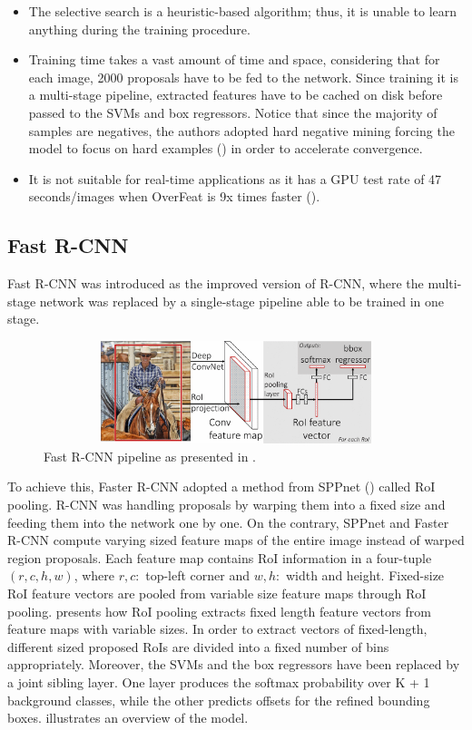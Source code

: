 \begin{itemize}
  \item The selective search is a heuristic-based algorithm; thus, it is unable to learn anything during the training procedure. 
  \item Training time takes a vast amount of time and space, considering that for each image, 2000 proposals have to be fed to the network. Since training it is a multi-stage pipeline, extracted features have to be cached on disk before passed to the SVMs and box regressors. Notice that since the majority of samples are negatives, the authors adopted hard negative mining forcing the model to focus on hard examples (\cite{felzenszwalb2009object}) in order to accelerate convergence.
  \item It is not suitable for real-time applications as it has a GPU test rate of  47 seconds/images when OverFeat is 9x times faster (\cite{girshick2015fast}). 
\end{itemize}

\subsection{Fast R-CNN}
Fast R-CNN was introduced as the improved version of R-CNN, where the multi-stage network was replaced by a single-stage pipeline able to be trained in one stage.

\begin{figure}[!htb]
  \centering
  \includegraphics[width=12cm, height=3cm]{figures/ch2/fig3.png}
  \caption{Fast R-CNN pipeline as presented in \cite{girshick2015fast}.}
  \label{fig3}
\end{figure}

To achieve this, Faster R-CNN adopted a method from SPPnet (\cite{he2015spatial}) called RoI pooling. R-CNN was handling proposals by warping them into a fixed size and feeding them into the network one by one. On the contrary, SPPnet and Faster R-CNN compute varying sized feature maps of the entire image instead of warped region proposals. Each feature map contains RoI information in a four-tuple $(r,c,h,w)$, where $r, c:$ top-left corner and $w, h:$ width and height. Fixed-size RoI feature vectors are pooled from variable size feature maps through RoI pooling.  presents how RoI pooling extracts fixed length feature vectors from feature maps with variable sizes. In order to extract vectors of fixed-length, different sized proposed RoIs are divided into a fixed number of bins appropriately. Moreover, the SVMs and the box regressors have been replaced by a joint sibling layer. One layer produces the softmax probability over K + 1 background classes, while the other predicts offsets for the refined bounding boxes.  illustrates an overview of the model. 

